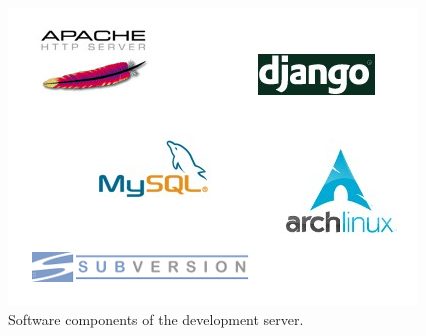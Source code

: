 \begin{figure}[htp]
\centering
\includegraphics[scale=0.6]{pictures/logos.png}
\caption{Software components of the development server.}
\label{logos}
\end{figure}

